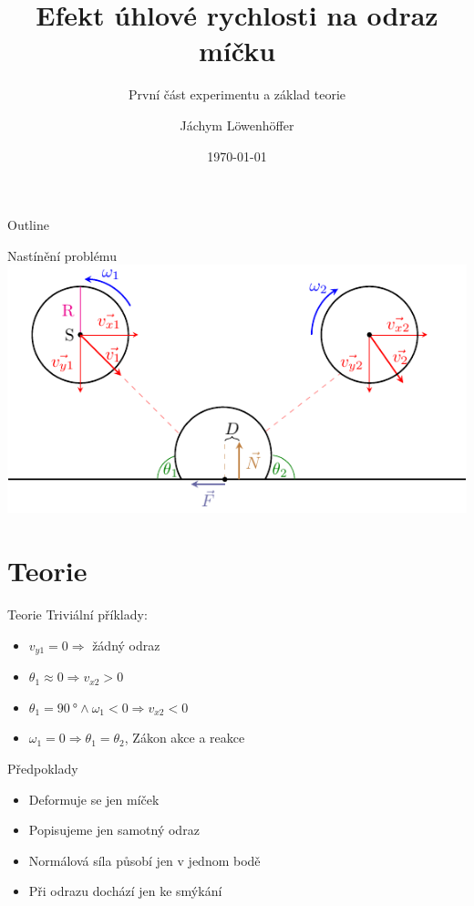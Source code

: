 \documentclass{beamer}
\title{Efekt úhlové rychlosti na odraz míčku}
\subtitle{První část experimentu a základ teorie}
\author{Jáchym Löwenhöffer}
\institute{GEVO JM}
\date{\today}
\begin{document}
 
 \begin{frame}
  \titlepage
 \end{frame}

 \begin{frame}{Outline}
  \tableofcontents
 \end{frame}

 \begin{frame}{Nastínění problému}
  \includegraphics{diagram.pdf}
 \end{frame}

 \section{Teorie} 

\begin{frame}
 \sectionpage
\end{frame}

 \begin{frame}{Teorie}
  Triviální příklady:
  \begin{itemize}
   \item $v_{y1}=0 \Rightarrow $ žádný odraz
   \item $\theta_1\approx0 \Rightarrow v_{x2} > 0$
   \item $\theta_1=\qty{90}{\degree} \land \omega_1<0 \Rightarrow v_{x2} < 0 $
   \item $\omega_1=0 \Rightarrow \theta_1=\theta_2 $, Zákon akce a reakce
  \end{itemize}
 \end{frame}

 \begin{frame}{Předpoklady}
 \begin{itemize}
  \item Deformuje se jen míček
  \item Popisujeme jen samotný odraz
  \item Normálová síla působí jen v jednom bodě
  \item Při odrazu dochází jen ke smýkání 
 \end{itemize}
\end{frame}
\end{document}
